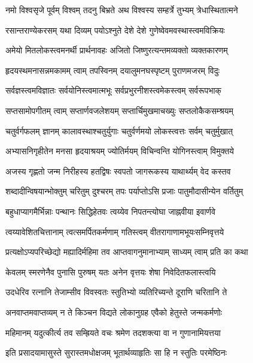 \twolineshloka
{नमो विश्वसृजे पूर्वम् विश्वम् तदनु बिभ्रते}
{अथ विश्वस्य सम्हर्त्रे तुभ्यम् त्रेधास्थितात्मने} %

\twolineshloka
{रसान्तराण्येकरसम् यथा दिव्यम् पयोऽश्नुते}
{देशे देशे गुणेष्वेवमवस्थास्त्वमविक्रियः} %

\twolineshloka
{अमेयो मितलोकस्त्वमनर्थी प्रार्थनावहः}
{अजितो जिष्णुरत्यन्तमव्यक्तो व्यक्तकारणम्} %

\twolineshloka
{हृदयस्थमनासन्नमकामम् त्वाम् तपस्विनम्}
{दयालुमनघस्पृष्टम् पुराणमजरम् विदुः} %

\twolineshloka
{सर्वज्ञस्त्वमविज्ञातः सर्वयोनिस्त्वमात्मभूः}
{सर्वप्रभुरनीशस्त्वमेकस्त्वम् सर्वरूपभाक्} %

\twolineshloka
{सप्तसामोपगीतम् त्वाम् सप्तार्णवजलेशयम्}
{सप्तार्चिमुखमाचख्युः सप्तलोकैकसम्श्रयम्} %

\twolineshloka
{चतुर्वर्गफलम् ज्ञानम् कालावस्थाश्चतुर्युगाः}
{चतुर्वर्णमयो लोकस्त्वत्तः सर्वम् चतुर्मुखात्} %

\twolineshloka
{अभ्यासनिगृहीतेन मनसा हृदयाश्रयम्}
{ज्योतिर्मयम् विचिन्वन्ति योगिनस्त्वाम् विमुक्तये} %

\twolineshloka
{अजस्य गृह्णतो जन्म निरीहस्य हतद्विषः}
{स्वपतो जागरूकस्य याथार्थ्यम् वेद कस्तव} %

\twolineshloka
{शब्दादीन्विषयान्भोक्तुम् चरितुम् दुश्चरम् तपः}
{पर्याप्तोऽसि प्रजाः पातुमौदासीन्येन वर्तितुम्} %

\twolineshloka
{बहुधाप्यागमैर्भिन्नाः पन्थानः सिद्धिहेतवः}
{त्वय्येव निपतन्त्योघा जाह्नवीया इवार्णवे} %

\twolineshloka
{त्वय्यावेशितचित्तानाम् त्वत्समर्पितकर्मणाम्}
{गतिस्त्वम् वीतरागाणामभूयःसम्निवृत्तये} %

\twolineshloka
{प्रत्यक्षोऽप्यपरिच्छेद्यो मह्यादिर्महिमा तव}
{आप्तवागनुमानाभ्याम् साध्यम् त्वाम् प्रति का कथा} %

\twolineshloka
{केवलम् स्मरणेनैव पुनासि पुरुषम् यतः}
{अनेन वृत्तयः शेषा निवेदितफलास्त्वयि} %

\twolineshloka
{उदधेरिव रत्नानि तेजाम्सीव विवस्वतः}
{स्तुतिभ्यो व्यतिरिच्यन्ते दूराणि चरितानि ते} %

\twolineshloka
{अनवाप्तमवाप्तव्यम् न ते किञ्चन विद्यते}
{लोकानुग्रह एवैको हेतुस्ते जन्मकर्मणोः} %

\twolineshloka
{महिमानम् यदुत्कीर्त्य तव सम्ह्रियते वचः}
{श्रमेण तदशक्त्या वा न गुणानामियत्तया} %

\twolineshloka
{इति प्रसादयामासुस्ते सुरास्तमधोक्षजम्}
{भूतार्थव्याहृतिः सा हि न स्तुतिः परमेष्ठिनः} %

